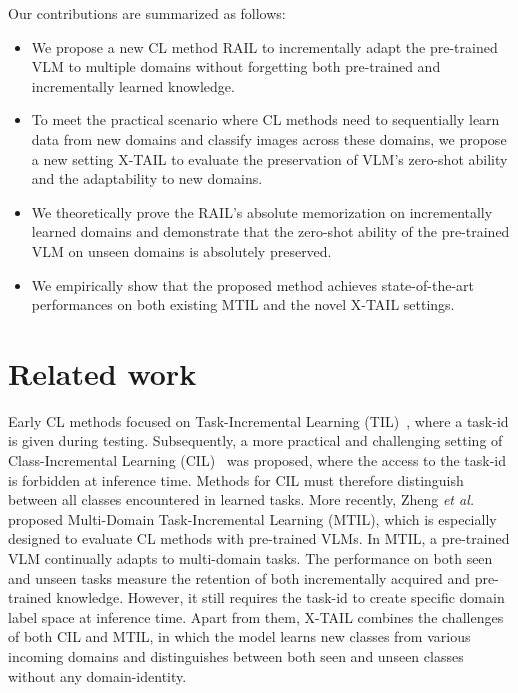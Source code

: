 \documentclass{article}
\begin{document}
Our contributions are summarized as follows:
\begin{itemize}
    \item We propose a new CL method RAIL to incrementally adapt the pre-trained VLM to multiple domains without forgetting both pre-trained and incrementally learned knowledge.
    \item To meet the practical scenario where CL methods need to sequentially learn data from new domains and classify images across these domains, we propose a new setting X-TAIL to evaluate the preservation of VLM's zero-shot ability and the adaptability to new domains.
    \item We theoretically prove the RAIL's absolute memorization on incrementally learned domains and demonstrate that the zero-shot ability of the pre-trained VLM on unseen domains is absolutely preserved.
    \item We empirically show that the proposed method achieves state-of-the-art performances on both existing MTIL and the novel X-TAIL settings.
\end{itemize}

\section{Related work}
\label{sec:related_work}
Early CL methods focused on Task-Incremental Learning (TIL)~\cite{hsu2018re}, where a task-id is given during testing. Subsequently, a more practical and challenging setting of Class-Incremental Learning (CIL)~\cite{rebuffi2017icarl} was proposed, where the access to the task-id is forbidden at inference time. Methods for CIL must therefore distinguish between all classes encountered in learned tasks.
More recently, Zheng \textit{et al.}~\cite{Zheng_2023_ICCV} proposed Multi-Domain Task-Incremental Learning (MTIL), which is especially designed to evaluate CL methods with pre-trained VLMs. In MTIL, a pre-trained VLM continually adapts to multi-domain tasks. The performance on both seen and unseen tasks measure the retention of both incrementally acquired and pre-trained knowledge. However, it still requires the task-id to create specific domain label space at inference time.
Apart from them, X-TAIL combines the challenges of both CIL and MTIL, in which the model learns new classes from various incoming domains and distinguishes between both seen and unseen classes without any domain-identity.
\end{document}
